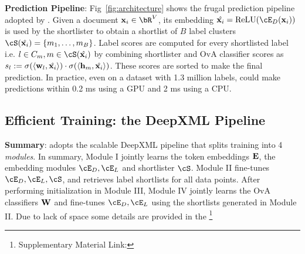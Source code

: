\textbf{Prediction Pipeline}: Fig~\ref{fig:architecture} shows the frugal prediction pipeline adopted by \alg. Given a document $\vx \in \bR^V$, its embedding $\hat\vx = \text{ReLU}(\cE_D(\vx))$ is used by the shortlister to obtain a shortlist of $B$ label clusters $\cS(\hat\vx) = \bc{m_1,\ldots,m_B}$. Label scores are computed for every shortlisted label i.e. $l \in C_m, m \in \cS(\hat\vx)$ by combining shortlister and OvA classifier scores as $s_l := \sigma(\left\langle{\protect{\mathbf{w}}_l},{\hat{\mathbf{x}_{i}}}\right\rangle)\cdot\sigma(\left\langle{\protect{\mathbf{h}}_m},{\hat{\mathbf{x}_{i}}}\right\rangle)$. These scores are sorted to make the final prediction. In practice, even on a dataset with 1.3 million labels, \alg could make predictions within 0.2 ms using a GPU and 2 ms using a CPU.

\subsection{Efficient Training: the DeepXML Pipeline}
\textbf{Summary}: \alg adopts the scalable DeepXML pipeline \cite{Dahiya21} that splits training into 4 \emph{modules}. In summary, Module I jointly learns the token embeddings $\protect{\mathbf{E}}$, the embedding modules $\cE_D, \cE_L$ and shortlister $\cS$. Module II fine-tunes $\cE_D, \cE_L, \cS$, and retrieves label shortlists for all data points. After performing initialization in Module III, Module IV jointly learns the OvA classifiers $\protect{\mathbf{W}}$ and fine-tunes $\cE_D, \cE_L$ using the shortlists generated in Module II. Due to lack of space some details are provided in the \suppl\footnote{Supplementary Material Link: }

